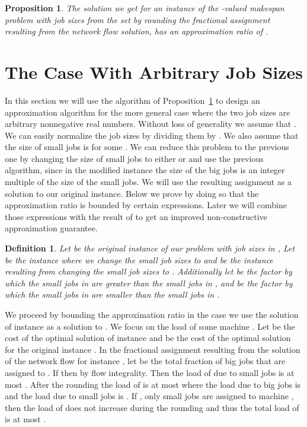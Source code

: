 \documentclass[11pt]{article}\usepackage{amsmath}
\newtheorem{definition}{Definition}[section]
\newtheorem{proposition}{Proposition}[section]
\begin{document}
\begin{proposition} \label{propos}
The solution we get for an instance of the -valued makespan problem
with job  sizes from the  set  by rounding  the fractional
assignment    resulting from  the  network  flow  solution, has  an
approximation ratio of .
\end{proposition}








\section{The Case With Arbitrary Job Sizes } \label{sec:int}

In this section we will use the algorithm of Proposition~\ref{propos}  to
design an approximation algorithm for  the more general case where the
two job sizes are arbitrary  nonnegative real numbers. Without loss of
generality we assume that . We can easily normalize the job sizes
by dividing them by . We also assume that the size of small jobs is
 for  some . We can reduce  this problem to the
previous one  by changing the size  of small jobs  to either  or   and  use  the previous
algorithm, since  in the modified instance 
the size of the big  jobs is an integer  multiple of the
size of the small jobs. We will use the resulting assignment as a solution
to  our  original  instance. Below  we  prove  by  doing so  that  the
approximation ratio  is bounded by certain expressions.  Later we will
combine those expressions with the result of \cite{svensson} to get an
improved non-constructive approximation guarantee.

\begin{definition}
Let  be the 
 original instance of our problem with job sizes in ,  Let  be the instance where we change the small job sizes to  and  be the instance resulting from changing the small job sizes to . Additionally let  be the factor by which the small jobs in  are greater than the small  jobs in , and  be the factor by which the small jobs in  are smaller than the small jobs in .
\end{definition}

We proceed by bounding the approximation ratio in the case we use the solution of instance  as a solution to . We focus on the load of some machine . Let  be the  cost of the optimal solution of instance  and  be the cost of the optimal solution for the original instance . In the fractional assignment resulting from the solution of the network flow for instance , let  be the total fraction of big jobs that are assigned to . If  then  by flow integrality. Then the load of  due to small jobs is at most . After the rounding the load of  is at most  where the load due to big jobs is  and the load due to small jobs is . If , only small jobs are assigned to machine , then the load of  does not increase during the rounding and thus the total load of  is at most .
\end{document}
